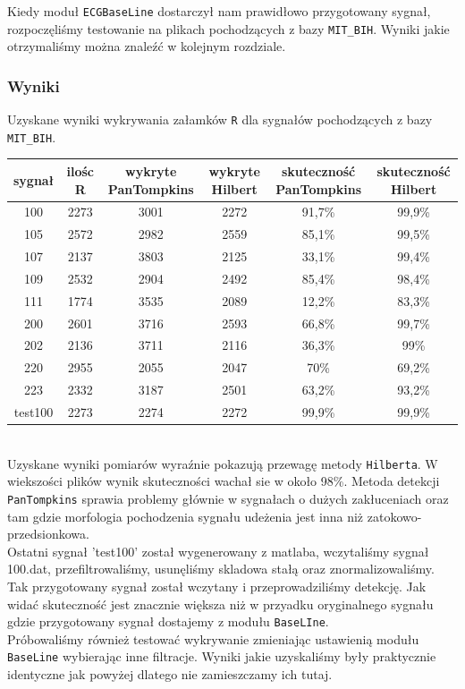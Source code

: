 \documentclass[a4paper, 11pt]{article}
\begin{document}
\indent Kiedy moduł \verb|ECGBaseLine| dostarczył nam prawidłowo przygotowany sygnał, rozpoczęliśmy testowanie na plikach pochodzących z bazy \verb|MIT_BIH|. Wyniki jakie otrzymaliśmy można znaleźć w kolejnym rozdziale.

\subsubsection{Wyniki}
\label{sec:rs:results}
Uzyskane wyniki wykrywania załamków \verb|R| dla sygnałów pochodzących z bazy \verb|MIT_BIH|.\\
\linebreak
\begin{tabular}{|c|c|c|c|c|c|}
\hline
sygnał & ilośc R & wykryte PanTompkins & wykryte Hilbert & skuteczność PanTompkins & skuteczność Hilbert\\ \hline
100   & 2273 & 3001 & 2272  & 91,7\% & 99,9\% \\ \hline
105   & 2572 & 2982 & 2559  & 85,1\% & 99,5\% \\ \hline
107   & 2137 & 3803 & 2125  & 33,1\% & 99,4\% \\ \hline
109   & 2532 & 2904 & 2492  & 85,4\% & 98,4\% \\ \hline
111   & 1774 & 3535 & 2089  & 12,2\% & 83,3\% \\ \hline
200   & 2601 & 3716 & 2593  & 66,8\% & 99,7\% \\ \hline
202   & 2136 & 3711 & 2116  & 36,3\% & 99\%   \\ \hline
220   & 2955 & 2055 & 2047  & 70\%   & 69,2\% \\ \hline
223   & 2332 & 3187 & 2501  & 63,2\% & 93,2\% \\ \hline
test100   & 2273 & 2274 & 2272  & 99,9\% & 99,9\% \\ \hline
\end{tabular}
\linebreak
\\
\indent Uzyskane wyniki pomiarów wyraźnie pokazują przewagę metody \verb|Hilberta|. W wiekszości plików wynik skuteczności wachał sie w około 98\%. Metoda detekcji \verb|PanTompkins| sprawia problemy głównie w sygnałach o dużych zakłuceniach oraz tam gdzie morfologia pochodzenia sygnału udeżenia jest inna niż zatokowo-przedsionkowa.\\
\indent Ostatni sygnał 'test100' został wygenerowany z matlaba, wczytaliśmy sygnał 100.dat, przefiltrowaliśmy, usunęliśmy skladowa stałą oraz znormalizowaliśmy. Tak przygotowany sygnał został wczytany i przeprowadziliśmy detekcję. Jak widać skuteczność jest znacznie większa niż w przyadku oryginalnego sygnału gdzie przygotowany sygnał dostajemy z modułu \verb|BaseLIne|.\\
\indent Próbowaliśmy również testować wykrywanie zmieniając ustawienią modułu \verb|BaseLine| wybierając inne filtracje. Wyniki jakie uzyskaliśmy były praktycznie identyczne jak powyżej dlatego nie zamieszczamy ich tutaj.
\end{document}
